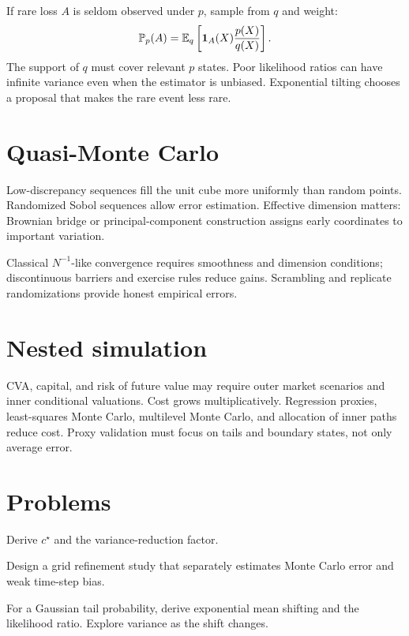 If rare loss $A$ is seldom observed under $p$, sample from $q$ and weight:
\[
\mathbb P_p(A)=\operatorname{\mathbb E}_q\left[
\mathbf 1_A(X)\frac{p(X)}{q(X)}
\right].
\]
The support of $q$ must cover relevant $p$ states. Poor likelihood ratios can have
infinite variance even when the estimator is unbiased. Exponential tilting chooses
a proposal that makes the rare event less rare.

\section{Quasi-Monte Carlo}

Low-discrepancy sequences fill the unit cube more uniformly than random points.
Randomized Sobol sequences allow error estimation. Effective dimension matters:
Brownian bridge or principal-component construction assigns early coordinates to
important variation.

Classical $N^{-1}$-like convergence requires smoothness and dimension conditions;
discontinuous barriers and exercise rules reduce gains. Scrambling and replicate
randomizations provide honest empirical errors.

\section{Nested simulation}

CVA, capital, and risk of future value may require outer market scenarios and inner
conditional valuations. Cost grows multiplicatively. Regression proxies, least-squares
Monte Carlo, multilevel Monte Carlo, and allocation of inner paths reduce cost.
Proxy validation must focus on tails and boundary states, not only average error.

\section{Problems}

\begin{exercise}
Derive $c^\star$ and the variance-reduction factor.
\end{exercise}
\begin{exercise}
Design a grid refinement study that separately estimates Monte Carlo error and weak
time-step bias.
\end{exercise}
\begin{exercise}
For a Gaussian tail probability, derive exponential mean shifting and the likelihood
ratio. Explore variance as the shift changes.
\end{exercise}


